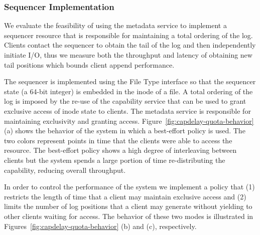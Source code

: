 \subsubsection{Sequencer Implementation}
\label{sec:sequencer-implementation}

We evaluate the feasibility of using the metadata service to implement a
sequencer resource that is responsible for maintaining a total ordering of the
log. Clients contact the sequencer to obtain the tail of the log and then
independently initiate I/O, thus we measure both the throughput and latency of
obtaining new tail positions which bounds client append performance.

The sequencer is implemented using the File Type interface so that the sequencer state
(a 64-bit integer) is embedded in the inode of a file.
A total ordering of the log is imposed by the re-use of the
capability service that can be used to grant exclusive access of inode state to
clients. The metadata service is responsible for maintaining exclusivity and
granting access. Figure~\ref{fig:capdelay-quota-behavior} (a) shows the
behavior of the system in which a best-effort policy is used.  The two colors
represent points in time that the clients were able to access the resource.
The best-effort policy shows a high degree of interleaving between clients but
the system spends a large portion of time re-distributing the capability,
reducing overall throughput.

In order to control the performance of the system we implement a policy that
(1) restricts the length of time that a client may maintain exclusive access
and (2) limits the number of log positions that a client may generate without
yielding to other clients waiting for access. The behavior of these two modes
is illustrated in Figures~\ref{fig:capdelay-quota-behavior} (b) and (c),
respectively.

